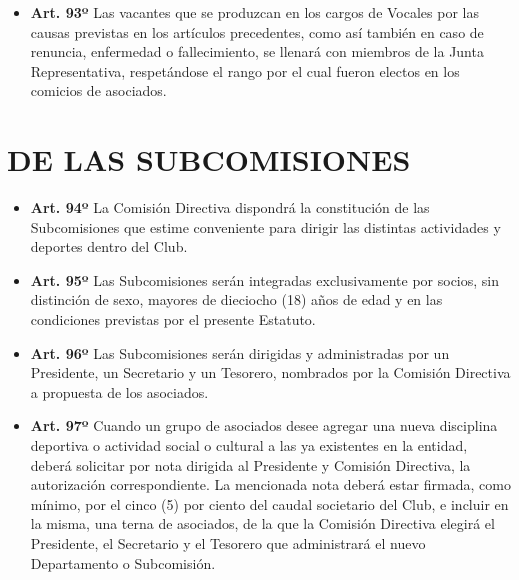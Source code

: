 \documentclass[]{book}
\providecommand{\tightlist}{%
  \setlength{\itemsep}{0pt}\setlength{\parskip}{0pt}}
\begin{document}
\begin{itemize}
\tightlist
\item
  \textbf{Art. 93º} Las vacantes que se produzcan en los cargos de
  Vocales por las causas previstas en los artículos precedentes, como
  así también en caso de renuncia, enfermedad o fallecimiento, se
  llenará con miembros de la Junta Representativa, respetándose el rango
  por el cual fueron electos en los comicios de asociados.
\end{itemize}

\chapter{DE LAS SUBCOMISIONES}\label{cap20}

\begin{itemize}
\tightlist
\item
  \textbf{Art. 94º} La Comisión Directiva dispondrá la constitución de
  las Subcomisiones que estime conveniente para dirigir las distintas
  actividades y deportes dentro del Club.
\end{itemize}

\begin{itemize}
\tightlist
\item
  \textbf{Art. 95º} Las Subcomisiones serán integradas exclusivamente
  por socios, sin distinción de sexo, mayores de dieciocho (18) años de
  edad y en las condiciones previstas por el presente Estatuto.
\end{itemize}

\begin{itemize}
\tightlist
\item
  \textbf{Art. 96º} Las Subcomisiones serán dirigidas y administradas
  por un Presidente, un Secretario y un Tesorero, nombrados por la
  Comisión Directiva a propuesta de los asociados.
\end{itemize}

\begin{itemize}
\tightlist
\item
  \textbf{Art. 97º} Cuando un grupo de asociados desee agregar una nueva
  disciplina deportiva o actividad social o cultural a las ya existentes
  en la entidad, deberá solicitar por nota dirigida al Presidente y
  Comisión Directiva, la autorización correspondiente. La mencionada
  nota deberá estar firmada, como mínimo, por el cinco (5) por ciento
  del caudal societario del Club, e incluir en la misma, una terna de
  asociados, de la que la Comisión Directiva elegirá el Presidente, el
  Secretario y el Tesorero que administrará el nuevo Departamento o
  Subcomisión.
\end{itemize}
\end{document}

